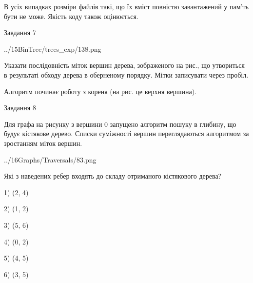 \documentclass[12pt, ukrainian]{article}
\begin{document}
{В усіх випадках розміри файлів такі, що їх вміст повністю завантажений у пам'ть бути не може. Якість коду також оцінюється.



\vspace{10mm}\par

\newpage
\begin{minipage}[t]{9.7cm}
               
{\begin{center}Завдання {7}\end{center}}
\vspace{-4mm}

\begin{center}
	{../15BinTree/trees_exp/138.png}
\end{center}
Указати послідовність міток вершин дерева, зображеного на рис., що утвориться в результаті обходу дерева в оберненому порядку. Мітки записувати через пробіл.\par Алгоритм починає роботу з кореня (на рис. це верхня вершина).\par

\end{minipage}
\vline \hspace{8mm}
\begin{minipage}[t]{8.0cm}
               
{\begin{center}Завдання {8}\end{center}}
\vspace{-4mm}
Для графа на рисунку з вершини 0 запущено алгоритм пошуку в глибину, що будує кістякове дерево. Списки суміжності вершин переглядаються алгоритмом за зростанням міток вершин.\par
\begin{center}
	{../16Graphs/Traversals/83.png}
\end{center}
\par Які з наведених ребер входять до складу отриманого кістякового дерева?\par
1) (2, 4)\par
2) (1, 2)\par
3) (5, 6)\par
4) (0, 2)\par
5) (4, 5)\par
6) (3, 5)\par
{\vskip 15pt} \par


\end{minipage}}
\end{document}
